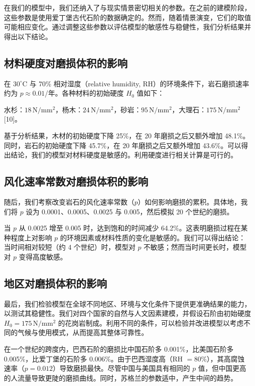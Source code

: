 \documentclass[11pt,a4paper]{ctexart}
\begin{document}
在我们的模型中，我们还纳入了与现实情景密切相关的参数。在之前的建模阶段，这些参数是使用爱丁堡古代石阶的数据确定的。然而，随着情景演变，它们的取值可能相应变化。通过调整这些参数以评估模型的敏感性与稳健性，我们分析结果并得出以下结论。

\subsection{材料硬度对磨损体积的影响}

在 $30^{\circ}$C 与 70\% 相对湿度（relative humidity, RH）的环境条件下，岩石磨损速率约为 \(p\approx 0.01\)/年。各种材料的初始硬度 \(H_0\) 值如下：

水杉：\(18\,\mathrm{N/mm^2}\)，杨木：\(24\,\mathrm{N/mm^2}\)，砂岩：\(95\,\mathrm{N/mm^2}\)，大理石：\(175\,\mathrm{N/mm^2}\)[10]。

基于分析结果，木材的初始硬度下降 25\%，在 20 年磨损之后又额外增加 48.1\%。同时，岩石的初始硬度下降 45.7\%，在 20 年磨损之后又额外增加 43.6\%。可以得出结论，我们的模型对材料硬度是敏感的。利用硬度进行相关计算是可行的。

\subsection{风化速率常数对磨损体积的影响}

随后，我们考察改变岩石的风化速率常数（\(p\)）如何影响磨损的累积。具体地，我们将 \(p\) 设为 0.0001、0.0005、0.0025 与 0.005，然后模拟 20 个世纪的磨损。

当 \(p\) 从 0.0025 增至 0.005 时，达到饱和的时间减少 64.2\%。这表明磨损过程在某种程度上对影响 \(p\) 的环境因素或材料性质的变化是敏感的。我们可以得出结论：当时间相对较短（约 4 个世纪）时，模型对 \(p\) 不敏感；然而当时间更长时，模型对 \(p\) 变得高度敏感。

\subsection{地区对磨损体积的影响}

最后，我们检验模型在全球不同地区、环境与文化条件下提供更准确结果的能力，以测试其稳健性。我们对四个国家的自然与人文因素建模，并假设石阶由初始硬度 \(H_0=175\,\mathrm{N/mm^2}\) 的花岗岩制成。利用不同的条件，可以检验并改进模型以考虑不同的气候与使用模式，从而提高其整体可靠性。

在一个世纪的跨度内，巴西石阶的磨损比中国石阶多 0.001\%，比美国石阶多 0.005\%，比爱丁堡的石阶多 0.006\%。由于巴西湿度高（RH \(=80\%\)），其高腐蚀速率（\(p=0.012\)）导致磨损最快。尽管中国与美国具有相同的 \(p\) 值，但中国更高的人流量导致更陡的磨损曲线。同时，苏格兰的参数适中，产生中间的趋势。
\end{document}
